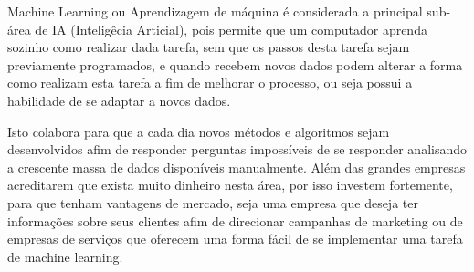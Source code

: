 Machine Learning ou Aprendizagem de máquina é considerada a principal sub-área de IA (Inteligêcia Articial), pois permite
que um computador aprenda sozinho como realizar dada tarefa, sem que os passos desta tarefa sejam previamente programados, e
quando recebem novos dados podem alterar a forma como realizam esta tarefa a fim de melhorar o processo, ou seja possui a 
habilidade de se adaptar a novos dados.


Isto colabora para que a cada dia novos métodos e algoritmos sejam desenvolvidos afim de responder perguntas impossíveis de se responder
analisando a crescente massa de dados disponíveis manualmente. Além das grandes empresas acreditarem que exista muito dinheiro nesta área,
por isso investem fortemente, para que tenham vantagens de mercado, seja uma empresa que deseja ter informações sobre
seus clientes afim de direcionar campanhas de marketing ou de empresas de serviços que oferecem uma forma fácil de se implementar
uma tarefa de machine learning.
    


 

